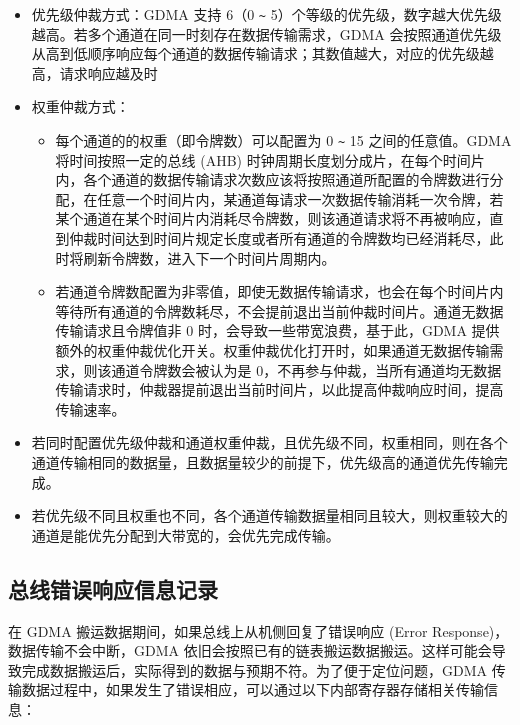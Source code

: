 \documentclass[main\_\_CN.tex]{subfiles}
\begin{document}
\begin{itemize}
\item 优先级仲裁方式：GDMA 支持 6（0 \verb+~+ 5）个等级的优先级，数字越大优先级越高。若多个通道在同一时刻存在数据传输需求，GDMA 会按照通道优先级从高到低顺序响应每个通道的数据传输请求；其数值越大，对应的优先级越高，请求响应越及时
\item 权重仲裁方式：
    \begin{itemize}
        \item 每个通道的的权重（即令牌数）可以配置为 0 \verb+~+ 15 之间的任意值。GDMA 将时间按照一定的总线 (AHB) 时钟周期长度划分成片，在每个时间片内，各个通道的数据传输请求次数应该将按照通道所配置的令牌数进行分配，在任意一个时间片内，某通道每请求一次数据传输消耗一次令牌，若某个通道在某个时间片内消耗尽令牌数，则该通道请求将不再被响应，直到仲裁时间达到时间片规定长度或者所有通道的令牌数均已经消耗尽，此时将刷新令牌数，进入下一个时间片周期内。
        \item 若通道令牌数配置为非零值，即使无数据传输请求，也会在每个时间片内等待所有通道的令牌数耗尽，不会提前退出当前仲裁时间片。通道无数据传输请求且令牌值非 0 时，会导致一些带宽浪费，基于此，GDMA 提供额外的权重仲裁优化开关。权重仲裁优化打开时，如果通道无数据传输需求，则该通道令牌数会被认为是 0，不再参与仲裁，当所有通道均无数据传输请求时，仲裁器提前退出当前时间片，以此提高仲裁响应时间，提高传输速率。
    \end{itemize}
\end{itemize}

\begin{tiplisting}
\vspace{-2em}
\begin{itemize}
    \item 若同时配置优先级仲裁和通道权重仲裁，且优先级不同，权重相同，则在各个通道传输相同的数据量，且数据量较少的前提下，优先级高的通道优先传输完成。
    \item 若优先级不同且权重也不同，各个通道传输数据量相同且较大，则权重较大的通道是能优先分配到大带宽的，会优先完成传输。
\end{itemize}
\end{tiplisting}


\subsection{总线错误响应信息记录}\label{sec:dma-bus-error-resp}

在 GDMA 搬运数据期间，如果总线上从机侧回复了错误响应 (Error Response)，数据传输不会中断，GDMA 依旧会按照已有的链表搬运数据搬运。这样可能会导致完成数据搬运后，实际得到的数据与预期不符。为了便于定位问题，GDMA 传输数据过程中，如果发生了错误相应，可以通过以下内部寄存器存储相关传输信息：
\end{document}
